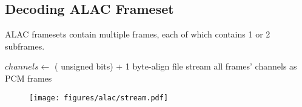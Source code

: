 \clearpage

\subsection{Decoding ALAC Frameset}
ALAC framesets contain multiple frames,
each of which contains 1 or 2 subframes.
\par
\noindent
{}
$channels \leftarrow$ ( unsigned bits) + 1\;
byte-align file stream\;
\Return all frames' channels as PCM frames\;
\EALGORITHM
\begin{figure}[h]
\texttt{[image: figures/alac/stream.pdf]}
\end{figure}

\clearpage

